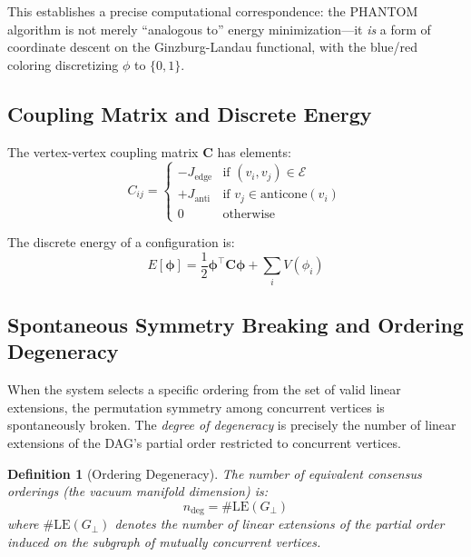 \documentclass[12pt,a4paper,twocolumn]{article}
\newtheorem{definition}{Definition}
\newcommand{\edgeset}{\mathcal{E}}
\begin{document}
This establishes a precise computational correspondence: the PHANTOM algorithm is not merely ``analogous to'' energy minimization---it \emph{is} a form of coordinate descent on the Ginzburg-Landau functional, with the blue/red coloring discretizing $\phi$ to $\{0, 1\}$.

\subsection{Coupling Matrix and Discrete Energy}

The vertex-vertex coupling matrix $\mathbf{C}$ has elements:
\begin{equation}
C_{ij} = \begin{cases}
-J_{\mathrm{edge}} & \text{if } (v_i, v_j) \in \edgeset \\
+J_{\mathrm{anti}} & \text{if } v_j \in \mathrm{anticone}(v_i) \\
0 & \text{otherwise}
\end{cases}
\end{equation}

The discrete energy of a configuration is:
\begin{equation}
E[\boldsymbol{\phi}] = \frac{1}{2} \boldsymbol{\phi}^\top \mathbf{C} \boldsymbol{\phi} + \sum_i V(\phi_i)
\end{equation}

\subsection{Spontaneous Symmetry Breaking and Ordering Degeneracy}
\label{sec:symmetry_breaking}

When the system selects a specific ordering from the set of valid linear extensions, the permutation symmetry among concurrent vertices is spontaneously broken. The \emph{degree of degeneracy} is precisely the number of linear extensions of the DAG's partial order restricted to concurrent vertices.

\begin{definition}[Ordering Degeneracy]
The number of equivalent consensus orderings (the vacuum manifold dimension) is:
\begin{equation}
n_{\mathrm{deg}} = \#\text{LE}(G_{\perp})
\end{equation}
where $\#\text{LE}(G_{\perp})$ denotes the number of linear extensions of the partial order induced on the subgraph of mutually concurrent vertices.
\end{definition}
\end{document}

